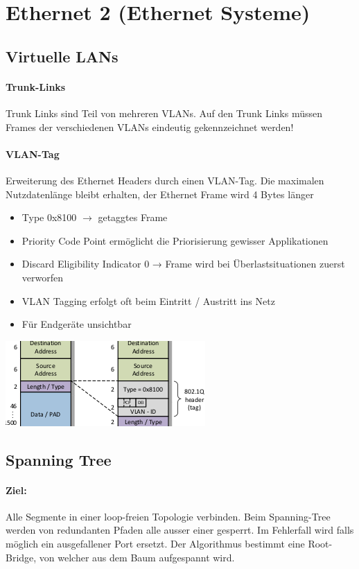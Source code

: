 
\section{Ethernet 2 (Ethernet Systeme)}

\subsection{Virtuelle LANs}

\paragraph{Trunk-Links} Trunk Links sind Teil von mehreren VLANs. Auf den Trunk Links müssen Frames der verschiedenen VLANs eindeutig gekennzeichnet werden!

\paragraph{VLAN-Tag} Erweiterung des Ethernet Headers durch einen
VLAN-Tag.
Die maximalen Nutzdatenlänge bleibt erhalten,
der Ethernet Frame wird 4 Bytes länger
{
\begin{itemize}[noitemsep]
    \item Type 0x8100 $\to$ getaggtes Frame
    \item Priority Code Point ermöglicht die Priorisierung gewisser Applikationen
    \item Discard Eligibility Indicator 0 → Frame wird bei Überlastsituationen zuerst verworfen
    \item VLAN Tagging erfolgt oft beim Eintritt / Austritt ins Netz
    \item  Für Endgeräte unsichtbar
\end{itemize}
\includegraphics[scale=.75]{img/vlan.png}
\WhiteSpace
}

\subsection{Spanning Tree}

{\paragraph{Ziel:}  Alle Segmente in einer loop-freien Topologie verbinden.
    Beim Spanning-Tree werden von redundanten Pfaden alle ausser einer gesperrt. Im Fehlerfall wird falls möglich ein ausgefallener Port ersetzt.
    Der Algorithmus bestimmt eine Root-Bridge, von welcher aus dem Baum aufgespannt wird.}

